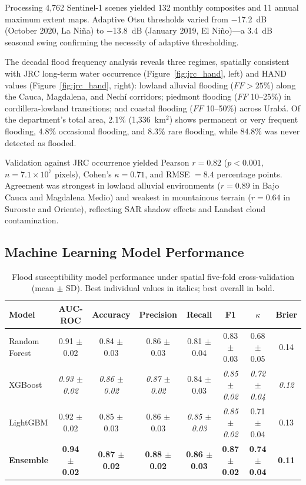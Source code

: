 \documentclass{article}
\begin{document}
Processing 4,762 Sentinel-1 scenes yielded 132 monthly composites and 11 annual maximum extent maps. Adaptive Otsu thresholds varied from \SI{-17.2}{\deci\bel} (October 2020, La Ni\~na) to \SI{-13.8}{\deci\bel} (January 2019, El Ni\~no)---a \SI{3.4}{\deci\bel} seasonal swing confirming the necessity of adaptive thresholding.

The decadal flood frequency analysis reveals three regimes, spatially consistent with JRC long-term water occurrence (Figure~\ref{fig:jrc_hand}, left) and HAND values (Figure~\ref{fig:jrc_hand}, right): lowland alluvial flooding ($FF > 25\%$) along the Cauca, Magdalena, and Nech\'i corridors; piedmont flooding ($FF$ 10--25\%) in cordillera-lowland transitions; and coastal flooding ($FF$ 10--50\%) across Urab\'a. Of the department's total area, 2.1\% (1,336~km$^2$) shows permanent or very frequent flooding, 4.8\% occasional flooding, and 8.3\% rare flooding, while 84.8\% was never detected as flooded.

Validation against JRC occurrence yielded Pearson $r = 0.82$ ($p < 0.001$, $n = 7.1 \times 10^7$ pixels), Cohen's $\kappa = 0.71$, and RMSE $= 8.4$ percentage points. Agreement was strongest in lowland alluvial environments ($r = 0.89$ in Bajo Cauca and Magdalena Medio) and weakest in mountainous terrain ($r = 0.64$ in Suroeste and Oriente), reflecting SAR shadow effects and Landsat cloud contamination.

\subsection{Machine Learning Model Performance}

\begin{table}[htbp]
\caption{Flood susceptibility model performance under spatial five-fold cross-validation (mean $\pm$ SD). Best individual values in italics; best overall in bold.}
\label{tab:ml_results}
\centering
\footnotesize
\begin{tabular}{lccccccc}
\toprule
\textbf{Model} & \textbf{AUC-ROC} & \textbf{Accuracy} & \textbf{Precision} & \textbf{Recall} & \textbf{F1} & \textbf{$\kappa$} & \textbf{Brier} \\
\midrule
Random Forest   & 0.91 $\pm$ 0.02 & 0.84 $\pm$ 0.03 & 0.86 $\pm$ 0.03 & 0.81 $\pm$ 0.04 & 0.83 $\pm$ 0.03 & 0.68 $\pm$ 0.05 & 0.14 \\
XGBoost         & \textit{0.93 $\pm$ 0.02} & \textit{0.86 $\pm$ 0.02} & \textit{0.87 $\pm$ 0.02} & 0.84 $\pm$ 0.03 & \textit{0.85 $\pm$ 0.02} & \textit{0.72 $\pm$ 0.04} & \textit{0.12} \\
LightGBM        & 0.92 $\pm$ 0.02 & 0.85 $\pm$ 0.03 & 0.86 $\pm$ 0.03 & \textit{0.85 $\pm$ 0.03} & \textit{0.85 $\pm$ 0.02} & 0.71 $\pm$ 0.04 & 0.13 \\
\textbf{Ensemble} & \textbf{0.94 $\pm$ 0.02} & \textbf{0.87 $\pm$ 0.02} & \textbf{0.88 $\pm$ 0.02} & \textbf{0.86 $\pm$ 0.03} & \textbf{0.87 $\pm$ 0.02} & \textbf{0.74 $\pm$ 0.04} & \textbf{0.11} \\
\bottomrule
\end{tabular}
\end{table}
\end{document}
